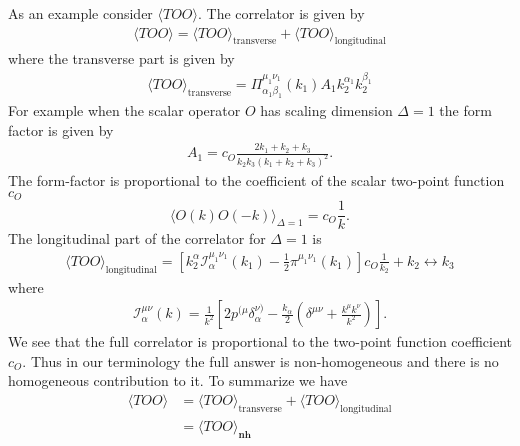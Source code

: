 \documentclass[a4paper,11pt]{article}
\begin{document}
As an example consider $\langle TOO\rangle$. The correlator is given by \cite{Bzowski:2013sza}
\begin{align}
\langle TOO\rangle =\langle TOO\rangle_{\text{transverse}}+\langle TOO\rangle_{\text{longitudinal}}
\end{align}
where the transverse part is given by
\begin{align}
\langle TOO\rangle_{\text{transverse}}=\Pi^{\mu_1\nu_1}_{\alpha_1\beta_1}(k_1)A_1k_2^{\alpha_1}k_2^{\beta_1}
\end{align}
 For example when the scalar operator $O$  has scaling dimension $\Delta=1$  the form factor is given by \cite{Bzowski:2013sza}
%
\begin{align}
A_1=c_O\frac{2k_1+k_2+k_3}{k_2k_3(k_1+k_2+k_3)^2}.
\end{align}
The form-factor is proportional to the coefficient of the scalar two-point function $c_O$
$$\langle O(k)O(-k)\rangle_{\Delta=1}= c_O \frac{1}{k}.$$
The longitudinal part of the correlator  for $\Delta=1$ is
%
\begin{align}
\langle TOO\rangle_{\text{longitudinal}}=\left[k_2^{\alpha}\mathcal I^{\mu_1\nu_1}_{\alpha}(k_1)-\frac{1}{2}\pi^{\mu_1\nu_1}(k_1)\right]c_O\frac{1}{k_2}+k_2\leftrightarrow k_3
\end{align}
where 
%
\begin{align}
\mathcal I^{\mu\nu}_{\alpha}(k)=\frac{1}{k^2}\left[2p^{(\mu}\delta^{\nu)}_{\alpha}-\frac{k_{\alpha}}{2}\left(\delta^{\mu\nu}+\frac{k^{\mu}k^{\nu}}{k^2}\right)\right].
\end{align}
We see that the full correlator is proportional to the two-point function coefficient $c_O$.  Thus in our terminology the full answer is non-homogeneous and there is no homogeneous contribution to it. To summarize we have
\begin{align}
\langle TOO\rangle &=\langle TOO\rangle_{\text{transverse}}+\langle TOO\rangle_{\text{longitudinal}}\nonumber\\
&=\langle TOO\rangle_{\textbf{nh}}
\end{align}
\end{document}
